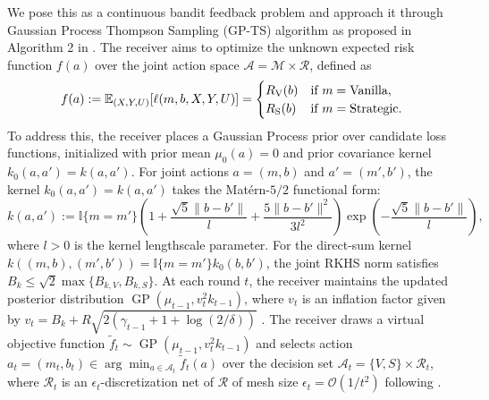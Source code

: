 We pose this as a continuous bandit feedback problem and approach it through Gaussian Process Thompson Sampling (GP-TS) algorithm as proposed in Algorithm 2 in \citet{chowdhury2017kernelized}. The receiver aims to optimize the unknown expected risk function $f(a)$ over the joint action space $\mathcal{A} = \mathcal{M} \times \mathcal{R}$, defined as
\begin{equation}
\label{eq:expected_risk_definition}
f(a) := \mathbb{E}_{(X,Y,U)}[\ell(m,b,X,Y,U)] = \begin{cases} R_{\mathrm{V}}(b) & \text{if } m = \text{Vanilla}, \\ R_{\mathrm{S}}(b) & \text{if } m = \text{Strategic}. \end{cases}
\end{equation}
To address this, the receiver places a Gaussian Process prior over candidate loss functions, initialized with prior mean $\mu_0(a) = 0$ and prior covariance kernel $k_0(a, a') = k(a, a')$. For joint actions $a = (m, b)$ and $a' = (m', b')$, the kernel $k_0(a, a') = k(a, a')$ takes the Matérn-$5/2$ functional form:
\begin{equation}
\label{eq:matern_kernel_def}
k(a, a') := \mathbb{I}\{m = m'\}\left(1 + \frac{\sqrt{5}\|b - b'\|}{l} + \frac{5\|b - b'\|^2}{3 l^2}\right) \exp\left( -\frac{\sqrt{5}\|b - b'\|}{l} \right),
\end{equation}
where $l > 0$ is the kernel lengthscale parameter. For the direct-sum kernel $k((m,b),(m',b')) = \mathbb{I}\{m=m'\}k_0(b,b')$, the joint RKHS norm satisfies $B_k \le \sqrt{2}\max\{B_{k,V}, B_{k,S}\}$. At each round $t$, the receiver maintains the updated posterior distribution $\operatorname{GP}(\mu_{t-1}, v_t^2 k_{t-1})$, where $v_t$ is an inflation factor given by $v_t = B_k + R\sqrt{2(\gamma_{t-1}+1+\log(2/\delta))}$ \citep{chowdhury2017kernelized}. The receiver draws a virtual objective function $\widetilde{f}_t \sim \operatorname{GP}(\mu_{t-1}, v_t^2 k_{t-1})$ and selects action $a_t = (m_t, b_t) \in \arg\min_{a \in \mathcal{A}_t} \widetilde{f}_t(a)$ over the decision set $\mathcal{A}_t = \{V, S\} \times \mathcal{R}_t$, where $\mathcal{R}_t$ is an $\epsilon_t$-discretization net of $\mathcal{R}$ of mesh size $\epsilon_t = \mathcal{O}(1/t^2)$ following \citet{chowdhury2017kernelized}.

